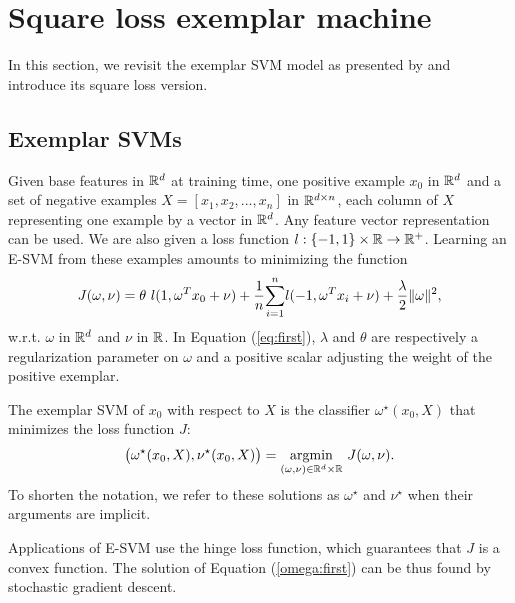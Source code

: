 \section{Square loss exemplar machine}\label{lsesvm}
In this section, we revisit the exemplar SVM model as presented by \cite{Efros11} and introduce its square loss version.
\subsection{Exemplar SVMs} \label{esvm}
Given base features in $\mathbb R^d$ at training time, one positive example $x_0$ in $\mathbb R^d$ and a set of negative examples $X = [x_1, x_2,...,x_n]$ in $\mathbb R^{d\times n}$, each column of $X$ representing one example by a vector in $\mathbb R^d$. 
Any feature vector representation can be used.
We are also given a loss function $l:\{-1, 1\}\times \mathbb R\rightarrow\mathbb R^+$. Learning an E-SVM from these examples amounts to minimizing the function 
\begin{equation}
J(\omega, \nu) = \theta \ l(1, \omega^Tx_0+\nu) +\dfrac{1}{n}\displaystyle{\sum_{i=1}^n} l(-1, \omega^T x_i+\nu)+\dfrac{\lambda}{2}\|\omega\|^2, \label{eq:first}
\end{equation}
w.r.t. $\omega$ in $\mathbb R^d$ and $\nu$ in $\mathbb R$. In Equation (\ref{eq:first}), $\lambda$ and $\theta$ are respectively a regularization parameter on $\omega$ and a positive scalar adjusting the weight of the positive exemplar.

The  exemplar SVM of $x_0$ with respect to $X$ is the classifier $\omega^\star(x_0,X)$ that minimizes the loss function $J$:
\begin{equation}
\big(\omega^\star(x_0, X), \nu^\star(x_0, X)\big) = \underset{(\omega,\nu)\in\mathbb R^d\times\mathbb R}{\operatorname*{argmin}} \ J(\omega, \nu). \label{omega:first}
\end{equation}
To shorten the notation, we refer to these solutions as $\omega^\star$ and $\nu^\star$ when their arguments are implicit.

Applications of E-SVM use the hinge loss function, which guarantees that $J$ is a convex function. The solution of Equation (\ref{omega:first}) can be thus found by stochastic gradient descent.

